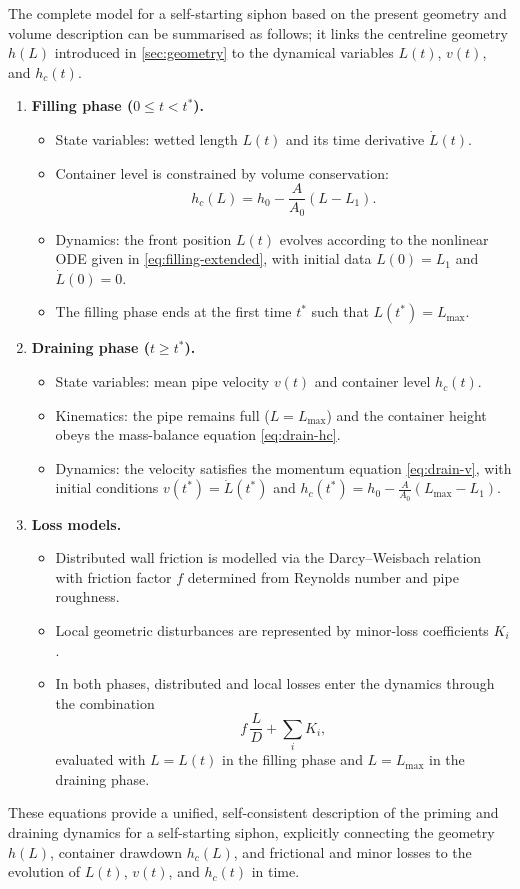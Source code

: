 \documentclass[11pt]{article}
\begin{document}
The complete model for a self-starting siphon based on the present geometry and volume
description can be summarised as follows; it links the centreline geometry $h(L)$ introduced in \cref{sec:geometry} to the dynamical variables $L(t)$, $v(t)$, and $h_c(t)$.
\begin{enumerate}
  \item \textbf{Filling phase ($0 \le t < t^*$).}
    \begin{itemize}
      \item State variables: wetted length $L(t)$ and its time derivative $\dot L(t)$.
      \item Container level is constrained by volume conservation:
            \[
              h_c(L) = h_0 - \frac{A}{A_0}(L - L_1).
            \]
      \item Dynamics: the front position $L(t)$ evolves according to the nonlinear ODE
            given in \eqref{eq:filling-extended},
            with initial data $L(0) = L_1$ and $\dot L(0) = 0$.
      \item The filling phase ends at the first time $t^*$ such that $L(t^*) = L_{\max}$.
    \end{itemize}
  \item \textbf{Draining phase ($t \ge t^*$).}
    \begin{itemize}
      \item State variables: mean pipe velocity $v(t)$ and container level $h_c(t)$.
      \item Kinematics: the pipe remains full ($L = L_{\max}$) and the container height obeys
            the mass-balance equation \eqref{eq:drain-hc}.
      \item Dynamics: the velocity satisfies the momentum equation \eqref{eq:drain-v},
            with initial conditions
            $v(t^*) = \dot L(t^*)$ and
            $h_c(t^*) = h_0 - \frac{A}{A_0}(L_{\max} - L_1)$.
    \end{itemize}
  \item \textbf{Loss models.}
    \begin{itemize}
      \item Distributed wall friction is modelled via the Darcy--Weisbach relation with
            friction factor $f$ determined from Reynolds number and pipe roughness.
      \item Local geometric disturbances are represented by minor-loss coefficients $K_i$.
      \item In both phases, distributed and local losses enter the dynamics through the
            combination
            \[
              f\,\frac{L}{D} + \sum_i K_i,
            \]
            evaluated with $L = L(t)$ in the filling phase and $L = L_{\max}$ in the
            draining phase.
    \end{itemize}
\end{enumerate}
These equations provide a unified, self-consistent description of the priming and draining
dynamics for a self-starting siphon, explicitly connecting the geometry $h(L)$, container
drawdown $h_c(L)$, and frictional and minor losses to the evolution of $L(t)$, $v(t)$, and
$h_c(t)$ in time.
\end{document}
